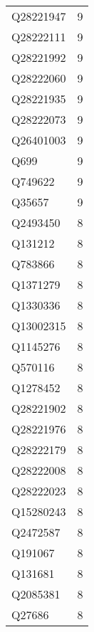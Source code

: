 \begin{tabular}{lr}
   Q28221947 &                             9 \\
   Q28222111 &                             9 \\
   Q28221992 &                             9 \\
   Q28222060 &                             9 \\
   Q28221935 &                             9 \\
   Q28222073 &                             9 \\
   Q26401003 &                             9 \\
        Q699 &                             9 \\
     Q749622 &                             9 \\
      Q35657 &                             9 \\
    Q2493450 &                             8 \\
     Q131212 &                             8 \\
     Q783866 &                             8 \\
    Q1371279 &                             8 \\
    Q1330336 &                             8 \\
   Q13002315 &                             8 \\
    Q1145276 &                             8 \\
     Q570116 &                             8 \\
    Q1278452 &                             8 \\
   Q28221902 &                             8 \\
   Q28221976 &                             8 \\
   Q28222179 &                             8 \\
   Q28222008 &                             8 \\
   Q28222023 &                             8 \\
   Q15280243 &                             8 \\
    Q2472587 &                             8 \\
     Q191067 &                             8 \\
     Q131681 &                             8 \\
    Q2085381 &                             8 \\
      Q27686 &                             8 \\

\end{tabular}
